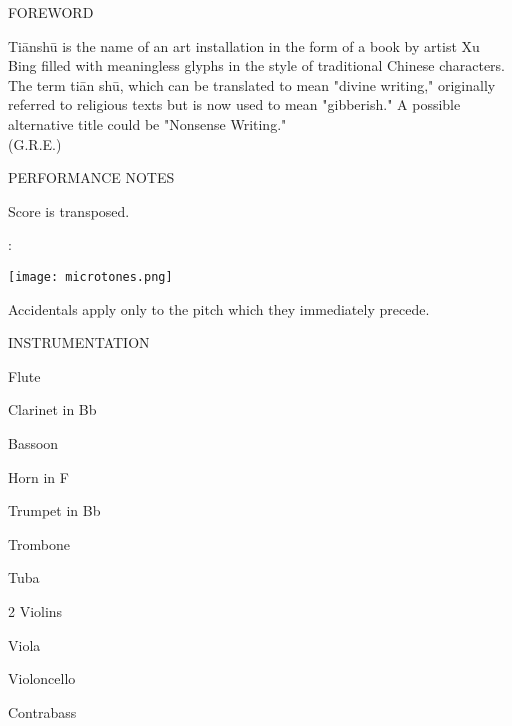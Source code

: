 \documentclass[10pt]{article}
\begin{document}
\begin{center}
\huge FOREWORD
\end{center}

\begin{center}
Ti\=ansh\=u is the name of an art installation in the form of a book by artist Xu Bing filled with meaningless glyphs in the style of traditional Chinese characters. The term ti\=an sh\=u, which can be translated to mean "divine writing," originally referred to religious texts but is now used to mean "gibberish." A possible alternative title could be "Nonsense Writing."\\
\phantom{text} \hfill (G.R.E.)
  \end{center}
  
\vspace*{1\baselineskip}

\begin{center}
\huge PERFORMANCE NOTES
\end{center}

\begin{center}
Score is transposed.
\end{center}

\begin{center}
:
\end{center}

\begin{center}
\texttt{[image: microtones.png]}
\end{center}

\begin{center}
Accidentals apply only to the pitch which they immediately precede.
\end{center}

\vspace*{0.3\baselineskip}

\begin{center}
\huge INSTRUMENTATION
\end{center}
\begin{center}
Flute
\end{center}
\begin{center}
Clarinet in Bb
\end{center}
\begin{center}
Bassoon
\end{center}
\begin{center}
Horn in F
\end{center}
\begin{center}
Trumpet in Bb
\end{center}
\begin{center}
Trombone
\end{center}
\begin{center}
Tuba
\end{center}
\begin{center}
2 Violins
\end{center}
\begin{center}
Viola
\end{center}
\begin{center}
Violoncello
\end{center}
\begin{center}
Contrabass
\end{center}
\end{document}
